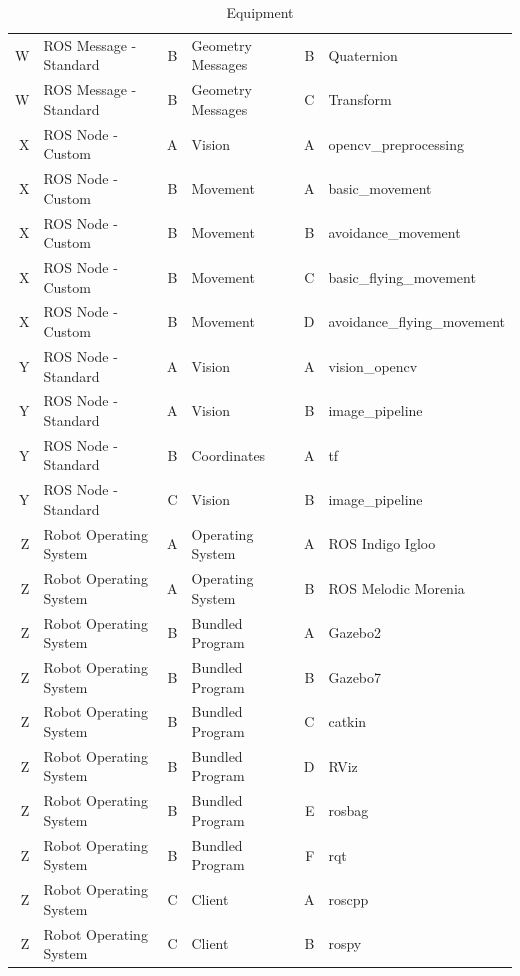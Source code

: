 \documentclass{article}
\begin{document}
\begin{table}
\begin{tabular}{|rl|rl|rl|}
			W & ROS Message - Standard & B & Geometry Messages  & B   & Quaternion                        \\
			W & ROS Message - Standard & B & Geometry Messages  & C   & Transform                         \\ \hline
			X & ROS Node - Custom      & A & Vision             & A   & opencv\_preprocessing             \\
			X & ROS Node - Custom      & B & Movement           & A   & basic\_movement                   \\
			X & ROS Node - Custom      & B & Movement           & B   & avoidance\_movement               \\
			X & ROS Node - Custom      & B & Movement           & C   & basic\_flying\_movement           \\
			X & ROS Node - Custom      & B & Movement           & D   & avoidance\_flying\_movement       \\ \hline
			Y & ROS Node - Standard    & A & Vision             & A   & vision\_opencv                    \\
			Y & ROS Node - Standard    & A & Vision             & B   & image\_pipeline                   \\
			Y & ROS Node - Standard    & B & Coordinates        & A   & tf                                \\
			Y & ROS Node - Standard    & C & Vision             & B   & image\_pipeline                   \\ \hline
			Z & Robot Operating System & A & Operating System   & A   & ROS Indigo Igloo                  \\
			Z & Robot Operating System & A & Operating System   & B   & ROS Melodic Morenia               \\
			Z & Robot Operating System & B & Bundled Program    & A   & Gazebo2                           \\
			Z & Robot Operating System & B & Bundled Program    & B   & Gazebo7                           \\
			Z & Robot Operating System & B & Bundled Program    & C   & catkin                            \\
			Z & Robot Operating System & B & Bundled Program    & D   & RViz                              \\
			Z & Robot Operating System & B & Bundled Program    & E   & rosbag                            \\
			Z & Robot Operating System & B & Bundled Program    & F   & rqt                               \\
			Z & Robot Operating System & C & Client             & A   & roscpp                            \\
			Z & Robot Operating System & C & Client             & B   & rospy                             \\ \hline
		\end{tabular}
		\normalsize
		\caption{Equipment}
		\label{table:equipment}
	\end{table}
	
\end{document}
